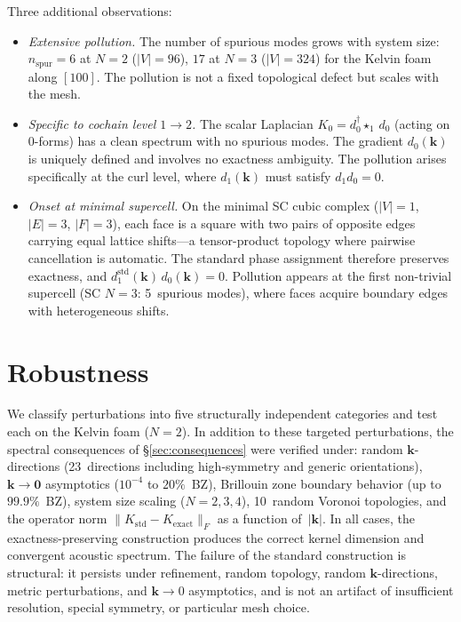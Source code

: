 \documentclass[preprint,12pt]{elsarticle}
\begin{document}
Three additional observations:
\begin{itemize}
  \item \emph{Extensive pollution.} The number of spurious modes grows with system size: $n_{\mathrm{spur}} = 6$ at $N{=}2$ ($|V|{=}96$), $17$ at $N{=}3$ ($|V|{=}324$) for the Kelvin foam along $[100]$. The pollution is not a fixed topological defect but scales with the mesh.
  \item \emph{Specific to cochain level $1{\to}2$.} The scalar Laplacian $K_0 = d_0^\dagger \star_1\,d_0$ (acting on 0-forms) has a clean spectrum with no spurious modes. The gradient $d_0(\mathbf{k})$ is uniquely defined and involves no exactness ambiguity. The pollution arises specifically at the curl level, where $d_1(\mathbf{k})$ must satisfy $d_1 d_0 = 0$.
  \item \emph{Onset at minimal supercell.} On the minimal SC cubic complex ($|V|{=}1$, $|E|{=}3$, $|F|{=}3$), each face is a square with two pairs of opposite edges carrying equal lattice shifts---a tensor-product topology where pairwise cancellation is automatic. The standard phase assignment therefore preserves exactness, and $d_1^{\mathrm{std}}(\mathbf{k})\,d_0(\mathbf{k}) = 0$. Pollution appears at the first non-trivial supercell (SC $N{=}3$: 5~spurious modes), where faces acquire boundary edges with heterogeneous shifts.
\end{itemize}

\section{Robustness}
\label{sec:robustness}

We classify perturbations into five structurally independent categories and test each on the Kelvin foam ($N{=}2$). In addition to these targeted perturbations, the spectral consequences of \S\ref{sec:consequences} were verified under: random $\mathbf{k}$-directions (23~directions including high-symmetry and generic orientations), $\mathbf{k} \to \mathbf{0}$ asymptotics ($10^{-4}$ to $20\%$~BZ), Brillouin zone boundary behavior (up to $99.9\%$~BZ), system size scaling ($N = 2, 3, 4$), 10~random Voronoi topologies, and the operator norm $\|K_{\mathrm{std}} - K_{\mathrm{exact}}\|_F$ as a function of~$|\mathbf{k}|$. In all cases, the exactness-preserving construction produces the correct kernel dimension and convergent acoustic spectrum. The failure of the standard construction is structural: it persists under refinement, random topology, random $\mathbf{k}$-directions, metric perturbations, and $\mathbf{k} \to 0$ asymptotics, and is not an artifact of insufficient resolution, special symmetry, or particular mesh choice.
\end{document}
